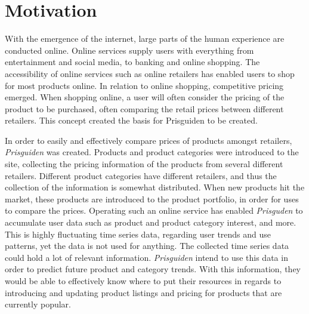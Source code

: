 \section{Motivation}
\label{section:BT:Motication}

With the emergence of the internet, large parts of the human experience are conducted online.
Online services supply users with everything from entertainment and social media, to banking and online shopping.
The accessibility of online services such as online retailers has enabled users to shop for most products online.
In relation to online shopping, competitive pricing emerged.
When shopping online, a user will often consider the pricing of the product to be purchased, often comparing the retail prices between different retailers.
This concept created the basis for Prisguiden to be created.


In order to easily and effectively compare prices of products amongst retailers, 
\textit{Prisguiden} was created.
Products and product categories were introduced to the site, collecting the pricing information of the products from several different retailers.
Different product categories have different retailers, and thus the collection of the information is somewhat distributed.
When new products hit the market, these products are introduced to the product portfolio, in order for uses to compare the prices.
Operating such an online service has enabled \textit{Prisguden} to accumulate user data such as product and product category interest, and more.
This is highly fluctuating time series data, regarding user trends and use patterns, yet the data is not used for anything.
The collected time series data could hold a lot of relevant information.
\textit{Prisguiden} intend to use this data in order to predict future product and category trends.
With this information, they would be able to effectively know where to put their resources in regards to introducing and updating product listings and pricing for products that are currently popular.
\linebreak




